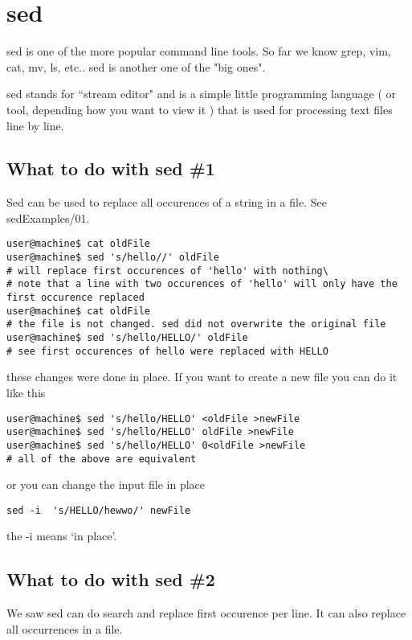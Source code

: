 \documentclass[10pt]{article}
\begin{document}
\section{sed}
sed is one of the more popular command line tools. So far we know grep, vim, cat, mv, ls, etc.. sed is another one of the "big ones".

sed stands for ``stream editor" and is a simple little programming language ( or tool, depending how you want to view it ) that is used for processing text files line by line.

\subsection{What to do with sed \#1}
Sed can be used to replace all occurences of a string in a file.
See sedExamples/01.

\begin{lstlisting}[style=term]
user@machine$ cat oldFile
user@machine$ sed 's/hello//' oldFile
# will replace first occurences of 'hello' with nothing\
# note that a line with two occurences of 'hello' will only have the first occurence replaced
user@machine$ cat oldFile
# the file is not changed. sed did not overwrite the original file
user@machine$ sed 's/hello/HELLO/' oldFile
# see first occurences of hello were replaced with HELLO
\end{lstlisting}

these changes were done in place. If you want to create a new file you can do it like this

\begin{lstlisting}[style=term]
user@machine$ sed 's/hello/HELLO' <oldFile >newFile
user@machine$ sed 's/hello/HELLO' oldFile >newFile
user@machine$ sed 's/hello/HELLO' 0<oldFile >newFile
# all of the above are equivalent
\end{lstlisting}

or you can change the input file in place

\begin{lstlisting}[style=term]
sed -i  's/HELLO/hewwo/' newFile
\end{lstlisting}

the -i means `in place'.

\subsection{What to do with sed \#2}
We saw sed can do search and replace first occurence per line. It can also replace all occurrences in a file.
\end{document}
